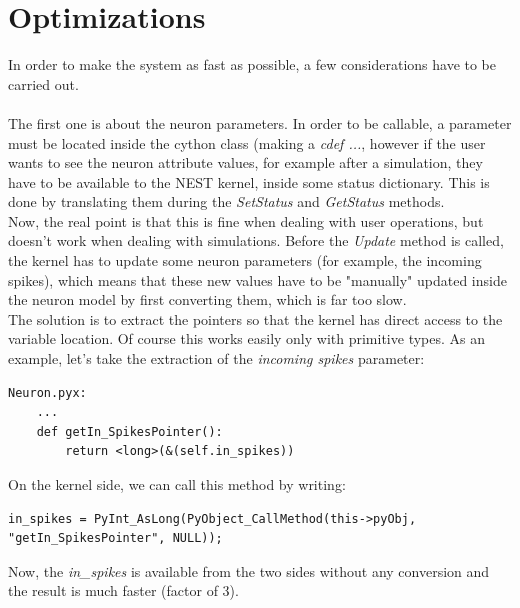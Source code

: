 \documentclass{article}
\begin{document}
\section{Optimizations}
In order to make the system as fast as possible, a few considerations have to be carried out.\\ \\
The first one is about the neuron parameters. In order to be callable, a parameter must be located inside the cython class (making a \emph{cdef ...}, however if the user wants to see the neuron attribute values, for example after a simulation, they have to be available to the NEST kernel, inside some status dictionary. This is done by translating them during the \emph{SetStatus} and \emph{GetStatus} methods. \\
Now, the real point is that this is fine when dealing with user operations, but doesn't work when dealing with simulations. Before the \emph{Update} method is called, the kernel has to update some neuron parameters (for example, the incoming spikes), which means that these new values have to be "manually" updated inside the neuron model by first converting them, which is far too slow. \\
The solution is to extract the pointers so that the kernel has direct access to the variable location. Of course this works easily only with primitive types. As an example, let's take the extraction of the \emph{incoming spikes} parameter:
\begin{verbatim}
Neuron.pyx:
    ...
    def getIn_SpikesPointer():
        return <long>(&(self.in_spikes))
\end{verbatim}
On the kernel side, we can call this method by writing:
\begin{verbatim}
in_spikes = PyInt_AsLong(PyObject_CallMethod(this->pyObj, "getIn_SpikesPointer", NULL));
\end{verbatim}
Now, the \emph{in\_spikes} is available from the two sides without any conversion and the result is much faster (factor of 3).\\ \\
\end{document}
